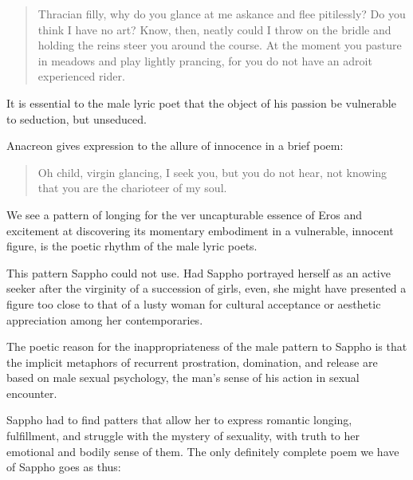 \begin{quotation}
    Thracian filly, why do you glance at me askance and flee pitilessly? Do you think I have no art? Know, then, neatly could I throw on the bridle and holding the reins steer you around the course. At the moment you pasture in meadows and play lightly prancing, for you do not have an adroit experienced rider.
\end{quotation}

\begin{nte}
    It is essential to the male lyric poet that the object of his passion be vulnerable to seduction, but unseduced.
\end{nte}


Anacreon gives expression to the allure of innocence in a brief poem:

\begin{quotation}
    Oh child, virgin glancing, I seek you, but you do not hear, not knowing that you are the charioteer of my soul.
\end{quotation}

\begin{rmk}
    We see a pattern of longing for the ver uncapturable essence of Eros and excitement at discovering its momentary embodiment in a vulnerable, innocent figure, is the poetic rhythm of the male lyric poets.
\end{rmk}

This pattern Sappho could not use. Had Sappho portrayed herself as an active seeker after the virginity of a succession of girls, even, she might have presented a figure too close to that of a lusty woman for cultural acceptance or aesthetic appreciation among her contemporaries. 

\begin{nte}
    The poetic reason for the inappropriateness of the male pattern to Sappho is that the implicit metaphors of recurrent prostration, domination, and release are based on male sexual psychology, the man's sense of his action in sexual encounter.
\end{nte}

Sappho had to find patters that allow her to express romantic longing, fulfillment, and struggle with the mystery of sexuality, with truth to her emotional and bodily sense of them. The only definitely complete poem we have of Sappho goes as thus:

